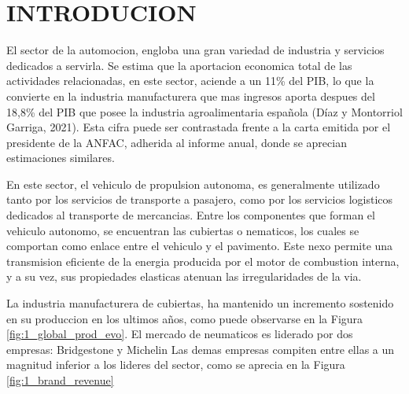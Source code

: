 
\section{INTRODUCION}

El sector de la automocion,
engloba una gran variedad de industria y servicios dedicados a servirla.
Se estima que la aportacion economica total de las actividades relacionadas,
en este sector, aciende a un 11\% del PIB,
lo que la convierte en la industria manufacturera que mas ingresos aporta
despues  del 18,8\% del PIB que posee la industria agroalimentaria española
(Díaz y Montorriol Garriga, 2021).
Esta cifra puede ser contrastada
frente a la carta emitida por el presidente de la ANFAC,
adherida al informe anual,
donde se aprecian estimaciones similares.

En este sector, el vehiculo de propulsion autonoma,
es generalmente utilizado tanto por los servicios de transporte a pasajero,
como por los servicios logisticos dedicados al transporte de mercancias.
Entre los componentes que forman el vehiculo autonomo,
se encuentran las cubiertas o nematicos,
los cuales se comportan como enlace entre el vehiculo y el pavimento.
Este nexo permite una transmision eficiente
de la energia producida por el motor de combustion interna,
y a su vez, sus propiedades elasticas atenuan las irregularidades de la via.

La industria manufacturera de cubiertas,
ha mantenido un incremento sostenido en su produccion en los ultimos años,
como puede observarse en la Figura \ref{fig:1_global_prod_evo}.
El mercado de neumaticos es liderado por dos empresas: Bridgestone y Michelin
\citep{rodgers2020tire}
Las demas empresas compiten entre ellas
a un magnitud inferior a los lideres del sector,
como se aprecia en la Figura \ref{fig:1_brand_revenue}

